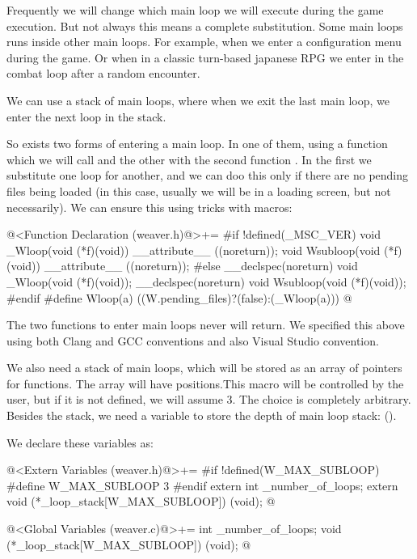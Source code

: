 
Frequently we will change which main loop we will execute during the
game execution. But not always this means a complete
substitution. Some main loops runs inside other main loops. For
example, when we enter a configuration menu during the game. Or when
in a classic turn-based japanese RPG we enter in the combat loop after
a random encounter.

We can use a stack of main loops, where when we exit the last main
loop, we enter the next loop in the stack.

So exists two forms of entering a main loop. In one of them, using a
function which we will call  and the other with the
second function . In the first we substitute one
loop for another, and we can doo this only if there are no pending
files being loaded (in this case, usually we will be in a loading
screen, but not necessarily). We can ensure this using tricks with
macros:

\iniciocodigo
@<Function Declaration (weaver.h)@>+=
#if !defined(_MSC_VER)
void _Wloop(void (*f)(void)) __attribute__ ((noreturn));
void Wsubloop(void (*f)(void)) __attribute__ ((noreturn));
#else
__declspec(noreturn) void _Wloop(void (*f)(void));
__declspec(noreturn) void Wsubloop(void (*f)(void));
#endif
#define Wloop(a) ((W.pending_files)?(false):(_Wloop(a)))
@
\fimcodigo

The two functions to enter main loops never will return. We specified
this above using both Clang and GCC conventions and also Visual Studio
convention.

We also need a stack of main loops, which will be stored as an array
of pointers for functions. The array will
have  positions.This macro will be
controlled by the user, but if it is not defined, we will assume
3. The choice is completely arbitrary. Besides the stack, we need a
variable to store the depth of main loop stack:
().

We declare these variables as:

\iniciocodigo
@<Extern Variables (weaver.h)@>+=
#if !defined(W_MAX_SUBLOOP)
#define W_MAX_SUBLOOP 3
#endif
extern int _number_of_loops;
extern void (*_loop_stack[W_MAX_SUBLOOP]) (void);
@
\fimcodigo

\iniciocodigo
@<Global Variables (weaver.c)@>+=
int _number_of_loops;
void (*_loop_stack[W_MAX_SUBLOOP]) (void);
@
\fimcodigo

